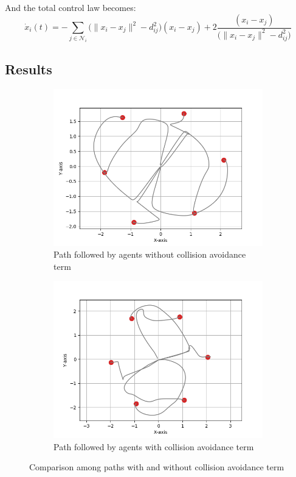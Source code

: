 \documentclass[a4paper,11pt,oneside]{book}
\begin{document}
And the total control law becomes:
\begin{equation}
\dot{x}_i(t) = - \sum_{j \in \mathcal{N}_i} \bigg( \lVert x_i - x_j \rVert^2 - d_{ij}^2 \bigg) (x_i - x_j ) + 2 \frac{(x_i-x_j)}{\bigg( \lVert x_i - x_j \rVert^2 - d_{ij}^2 \bigg)}
\label{Dynamics_with_collision_avoidance}
\end{equation}

\subsection{Results}
\begin{figure}[h]
\centering
	\begin{subfigure}{0.49\textwidth}	
	\includegraphics[scale=0.42]{Hexagon_path}
	\caption{Path followed by agents without collision avoidance term}
	\end{subfigure}
\hfill
	\begin{subfigure}{0.49\textwidth}	
	\includegraphics[scale=0.42]{Hexagon_path_collision}
	\caption{Path followed by agents with collision avoidance term}
	\end{subfigure}
\caption{Comparison among paths with and without collision avoidance term}
\label{Paths_comparison}
\end{figure}
\end{document}
